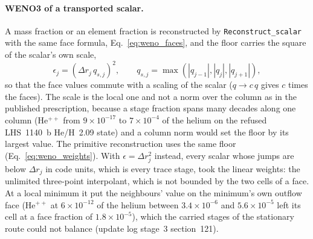 \paragraph{WENO3 of a transported scalar.}  A mass fraction or an element
fraction is reconstructed by \texttt{Reconstruct\_scalar}
with the same face formula, Eq.~\eqref{eq:weno_faces}, and the floor carries
the square of the scalar's own scale,
%
\begin{equation}
  \epsilon_j = \left(\Delta r_j\, q_{s,j}\right)^2, \qquad
  q_{s,j} = \max\left(|q_{j-1}|, |q_j|, |q_{j+1}|\right),
  \label{eq:weno_scalar_floor}
\end{equation}
%
so that the face values commute with a scaling of the scalar ($q\to c\,q$
gives $c$ times the faces).  The scale is the local one and not a norm over
the column as in the published prescription, because a stage fraction spans
many decades along one column (He$^{++}$ from $9\times10^{-17}$ to
$7\times10^{-4}$ of the helium on the refused LHS~1140~b He/H~2.09 state) and a column norm would set the floor by its
largest value.  The primitive reconstruction uses the same floor
(Eq.~\ref{eq:weno_weights}).  With $\epsilon=\Delta r_j^2$ instead, every scalar whose
jumps are below $\Delta r_j$ in code units, which is every trace stage, took
the linear weights: the unlimited three-point interpolant, which is not
bounded by the two cells of a face.  At a local minimum it put the
neighbours' value on the minimum's own outflow face (He$^{++}$ at
$6\times10^{-12}$ of the helium between $3.4\times10^{-6}$ and
$5.6\times10^{-5}$ left its cell at a face fraction of $1.8\times10^{-5}$),
which the carried stages of the stationary route could not balance (update
log stage~3 section~121).

